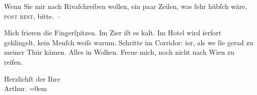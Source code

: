\pstart
           Wenn Sie mir nach Rivaſchreiben wollen, ein paar Zeilen, was ſehr hübſch
               wäre, \textsc{post rest}, bitte. –\pend
           
\pstart
           Mich frieren die Fingerſpitzen. Im Zi{\geminationm}er iſt es kalt. Im
               Hotel wird i{\geminationm}erfort geklingelt, kein Menſch weiſs warum.
               Schritte im Corridor: i{\geminationm}er, als we{\geminationn}{ }ſie gerad zu meiner Thür kämen. Alles in Wolken.
                  {\pb}Freue mich, noch nicht nach Wien zu reiſen.\pend
           
\pstart
           Herzlichſt der Ihre{\\[\baselineskip]}\spacefill\mbox{Arthur.}\pend
           \leftskip=0em{}\endnumbering{}  
      